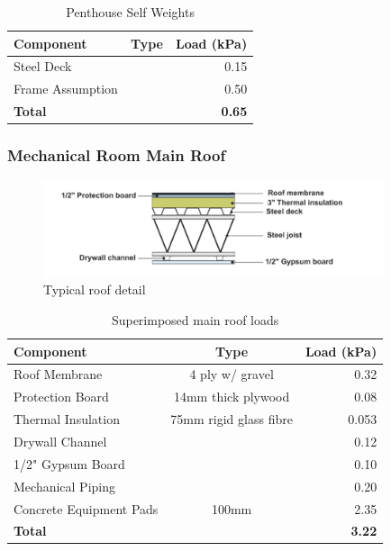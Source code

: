 \documentclass[12pt]{article}
\begin{document}
    \begin{table}[h!]
        \centering
        \caption{Penthouse Self Weights}
        \label{tab:selfPent}
    \begin{tabular}{lcr}
        \toprule
        \textbf{Component} & \textbf{Type} & \textbf{Load (kPa)}\\
        \midrule
        Steel Deck & & 0.15\\
        Frame Assumption & & 0.50\\
        \textbf{Total} & & \textbf{0.65}\\
        \bottomrule
    \end{tabular}
    \end{table}

\subsubsection{Mechanical Room Main Roof}
\begin{figure}
    \centering
\includegraphics[width=10cm]{Assets/Roof_Structure.png}
\caption{Typical roof detail}
\label{fig:roofStruct}
\end{figure}

\begin{table}[h!]
    \centering
    \caption{Superimposed main roof loads}
    \label{tab:superMain}
    \begin{tabular}{lcr}
        \toprule
        \textbf{Component} & \textbf{Type} & \textbf{Load (kPa)}\\
        \midrule
        Roof Membrane & 4 ply w/ gravel & 0.32\\
        Protection Board & 14mm thick plywood & 0.08\\
        Thermal Insulation & 75mm rigid glass fibre & 0.053\\
        Drywall Channel &  & 0.12\\
        1/2" Gypsum Board &  & 0.10\\
        Mechanical Piping &  & 0.20\\
        Concrete Equipment Pads & 100mm & 2.35\\
        \textbf{Total} & & \textbf{3.22}\\
        \bottomrule
    \end{tabular}
\end{table}
\end{document}

